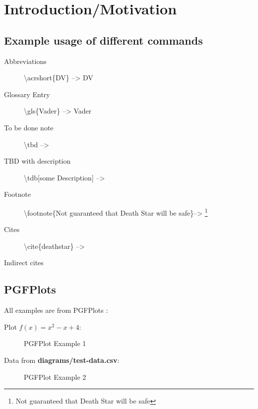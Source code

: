 \chapter{Introduction/Motivation}\label{chp:introduction}
\section{Example usage of different commands}\label{chp:introduction:examples}


 \begin{description}
	\item[Abbreviations] \textbackslash acrshort\{DV\} -->  \acrshort{DV}
	\item[Glossary Entry] \textbackslash gls\{Vader\} -->  \gls{Vader}
	\item[To be done note] \textbackslash tbd --> \tbd
	\item[TBD with description] \textbackslash tdb[some Description] --> 
	\item[Footnote] \textbackslash footnote\{Not guaranteed that Death Star will be safe\}--> \footnote{Not guaranteed that Death Star will be safe}
	\item[Cites] \textbackslash cite\{deathstar\} --> \cite{deathstar}
	\item[Indirect cites] 
 \end{description}
 
 
\section{PGFPlots}\label{chp:introduction:pgfexamples}

All examples are from PGFPlots \cite{pgfplots:sourceforge}:

Plot \textbf{$f(x) = x^2 - x +4$}:

\begin{figure}[H]
	\caption[PGFPlot 1]{PGFPlot Example 1}
	\label{fig:pgf:example1}
\end{figure}

Data from \textbf{diagrams/test-data.csv}:

\begin{figure}[H]
\loadedtable
{}
	\caption[PGFPlot 2]{PGFPlot Example 2}
	\label{fig:pgf:example2}
\end{figure}

